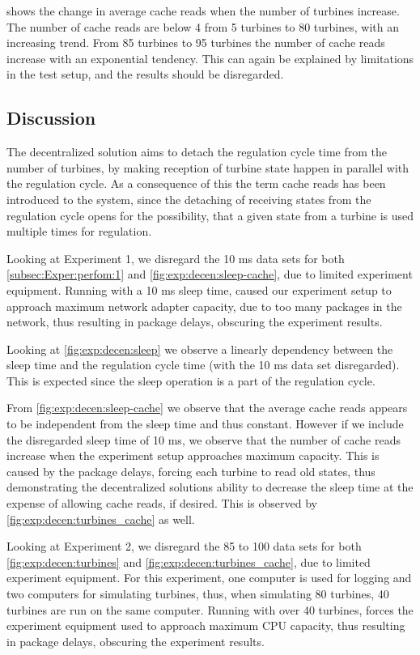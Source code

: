  shows the change in average cache reads when the number of turbines increase. The number of cache reads are below 4 from 5 turbines to 80 turbines, with an increasing trend. From 85 turbines to 95 turbines the number of cache reads increase with an exponential tendency. This can again be explained by limitations in the test setup, and the results should be disregarded.
        
        
\subsection{Discussion} 
The decentralized solution aims to detach the regulation cycle time from the number of turbines, by making reception of turbine state happen in parallel with the regulation cycle. As a consequence of this the term cache reads has been introduced to the system, since the detaching of receiving states from the regulation cycle opens for the possibility, that a given state from a turbine is used multiple times for regulation. 

Looking at Experiment 1, we disregard the 10 ms data sets for both \cref{subsec:Exper:perfom:1} and \cref{fig:exp:decen:sleep-cache}, due to limited experiment equipment. Running with a 10 ms sleep time, caused our experiment setup to approach maximum network adapter capacity, due to too many packages in the network, thus resulting in package delays, obscuring the experiment results.

Looking at \cref{fig:exp:decen:sleep} we observe a linearly dependency between the sleep time and the regulation cycle time (with the 10 ms data set disregarded). This is expected since the sleep operation is a part of the regulation cycle. 

From \cref{fig:exp:decen:sleep-cache} we observe that the average cache reads appears to be independent from the sleep time and thus constant. However if we include the disregarded sleep time of 10 ms, we observe that the number of cache reads increase when the experiment setup approaches maximum capacity. This is caused by the package delays, forcing each turbine to read old states, thus demonstrating the decentralized solutions ability to decrease the sleep time at the expense of allowing cache reads, if desired. This is observed by \cref{fig:exp:decen:turbines_cache} as well. 

Looking at Experiment 2, we disregard the 85 to 100 data sets for both \cref{fig:exp:decen:turbines} and \cref{fig:exp:decen:turbines_cache}, due to limited experiment equipment. For this experiment, one computer is used for logging and two computers for simulating turbines, thus, when simulating 80 turbines, 40 turbines are run on the same computer. Running with over 40 turbines, forces the experiment equipment used to approach maximum CPU capacity, thus resulting in package delays, obscuring the experiment results.

